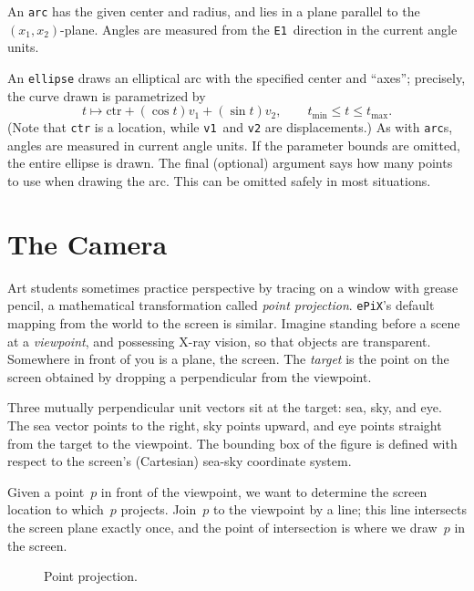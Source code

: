 \documentclass[12pt]{report}
\newcommand{\code}[1]{\texttt{#1}}
\newcommand{\ePiX}{\code{ePiX}}
\begin{document}
An \code{arc} has the given center and radius, and lies in a plane
parallel to the $(x_1,x_2)$-plane. Angles are measured from the
\code{E1}~direction in the current angle units.

An \code{ellipse} draws an elliptical arc with the specified center
and ``axes''; precisely, the curve drawn is parametrized by
\[
t\mapsto \mathrm{ctr} + (\cos t)v_1 + (\sin t)v_2,\qquad
t_\mathrm{min}\leq t\leq t_\mathrm{max}.
\]
(Note that \code{ctr} is a location, while \code{v1}~and \code{v2} are
displacements.)  As with \code{arc}s, angles are measured in current
angle units. If the parameter bounds are omitted,
the entire ellipse is drawn. The final (optional) argument says how
many points to use when drawing the arc. This can be omitted safely in
most situations.


\section{The Camera}

Art students sometimes practice perspective by tracing on a window
with grease pencil, a mathematical transformation called \emph{point
projection}. \ePiX's default mapping from the world to the screen is
similar. Imagine standing before a scene at a \emph{viewpoint}, and
possessing X-ray vision, so that objects are transparent. Somewhere in
front of you is a plane, the screen. The \emph{target} is the point on
the screen obtained by dropping a perpendicular from the viewpoint.

Three mutually perpendicular unit vectors sit at the target: sea, sky,
and eye. The sea vector points to the right, sky points upward, and
eye points straight from the target to the viewpoint. The bounding
box of the figure is defined with respect to the
screen's (Cartesian) sea-sky coordinate system.

Given a point~$p$ in front of the viewpoint, we want to determine the
screen location to which~$p$ projects. Join~$p$ to the viewpoint by a
line; this line intersects the screen plane exactly once, and the
point of intersection is where we draw~$p$ in the screen. 
\begin{figure}[hbt]
  \begin{center}
    
  \end{center}
  \caption{Point projection.}
  \label{fig:camera}
\end{figure}
\end{document}
